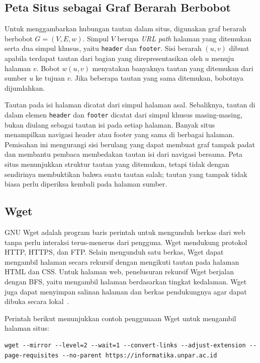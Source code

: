 \subsection{Peta Situs sebagai Graf Berarah Berbobot}
\label{sec:peta-situs}

Untuk menggambarkan hubungan tautan dalam situs, digunakan graf berarah berbobot $G=(V,E,w)$. Simpul $V$ berupa \textit{URL path} halaman yang ditemukan serta dua simpul khusus, yaitu \texttt{header} dan \texttt{footer}. Sisi berarah $(u,v)$ dibuat apabila terdapat tautan dari bagian yang direpresentasikan oleh $u$ menuju halaman $v$. Bobot $w(u,v)$ menyatakan banyaknya tautan yang ditemukan dari sumber $u$ ke tujuan $v$. Jika beberapa tautan yang sama ditemukan, bobotnya dijumlahkan.

Tautan pada isi halaman dicatat dari simpul halaman asal. Sebaliknya, tautan di dalam elemen \texttt{header} dan \texttt{footer} dicatat dari simpul khusus masing-masing, bukan diulang sebagai tautan isi pada setiap halaman. Banyak situs menampilkan navigasi header atau footer yang sama di berbagai halaman. Pemisahan ini mengurangi sisi berulang yang dapat membuat graf tampak padat dan membantu pembaca membedakan tautan isi dari navigasi bersama. Peta situs menunjukkan struktur tautan yang ditemukan, tetapi tidak dengan sendirinya membuktikan bahwa suatu tautan salah; tautan yang tampak tidak biasa perlu diperiksa kembali pada halaman sumber.

\subsection{Wget}

GNU Wget adalah program baris perintah untuk mengunduh berkas dari web tanpa perlu interaksi terus-menerus dari pengguna. Wget mendukung protokol HTTP, HTTPS, dan FTP. Selain mengunduh satu berkas, Wget dapat mengambil halaman secara rekursif dengan mengikuti tautan pada halaman HTML dan CSS. Untuk halaman web, penelusuran rekursif Wget berjalan dengan BFS, yaitu mengambil halaman berdasarkan tingkat kedalaman. Wget juga dapat menyimpan salinan halaman dan berkas pendukungnya agar dapat dibuka secara lokal~\cite{gnu:24:wget}.

Perintah berikut menunjukkan contoh penggunaan Wget untuk mengambil halaman situs:

\begin{lstlisting}[caption=Contoh pengambilan halaman situs menggunakan Wget]
wget --mirror --level=2 --wait=1 --convert-links --adjust-extension --page-requisites --no-parent https://informatika.unpar.ac.id
\end{lstlisting}

